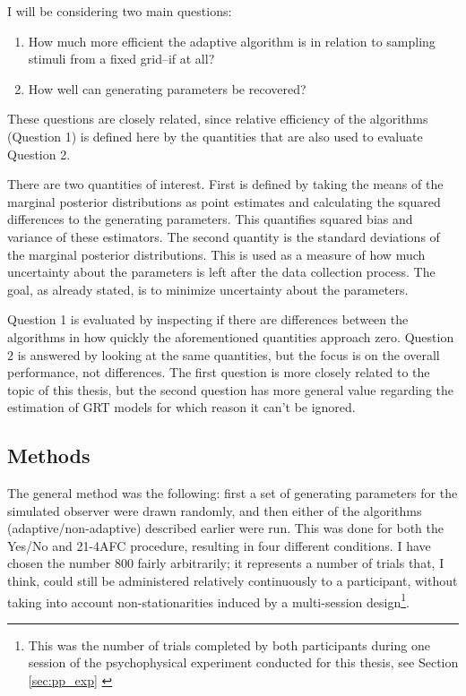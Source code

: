 \documentclass{article}\usepackage{knitr}
\begin{document}
I will be considering two main questions: 

\begin{enumerate}
  \item How much more efficient the adaptive algorithm is in relation to sampling stimuli from a fixed grid--if at all? 
  \item How well can generating parameters be recovered?
\end{enumerate}

These questions are closely related, since relative efficiency of the algorithms (Question 1) is defined here by the quantities that are also used to evaluate Question 2. 

There are two quantities of interest. First is defined by taking the means of the marginal posterior distributions as point estimates and calculating the squared differences to the generating parameters. This quantifies squared bias and variance of these estimators. The second quantity is the standard deviations of the marginal posterior distributions. This is used as a measure of how much uncertainty about the parameters is left after the data collection process. The goal, as already stated, is to minimize uncertainty about the parameters.

Question 1 is evaluated by inspecting if there are differences between the algorithms in how quickly the aforementioned quantities approach zero. Question 2 is answered by looking at the same  quantities, but the focus is on the overall performance, not differences. The first question is more closely related to the topic of this thesis, but the second question has more general value regarding the estimation of GRT models for which reason it can't be ignored. 

\subsection{Methods}

The general method was the following: first a set of generating parameters for the simulated observer were drawn randomly, and then either of the algorithms (adaptive/non-adaptive) described earlier were run. This was done for both the Yes/No and 21-4AFC procedure, resulting in four different conditions. I have chosen the number 800 fairly arbitrarily; it represents a number of trials that, I think, could still be administered relatively continuously to a participant, without taking into account non-stationarities induced by a multi-session design\footnote{This was the number of trials completed by both participants during one session of the psychophysical experiment conducted for this thesis, see Section \ref{sec:pp_exp} \textit{}}. 
\end{document}
